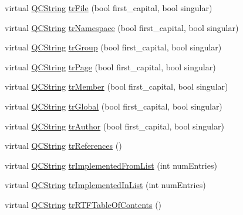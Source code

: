 \begin{DoxyCompactItemize}
\item 
virtual \mbox{\hyperlink{class_q_c_string}{Q\+C\+String}} \mbox{\hyperlink{class_translator_serbian_cyrillic_abe6a18cb43ae01fc5613ac70e79057f2}{tr\+File}} (bool first\+\_\+capital, bool singular)
\item 
virtual \mbox{\hyperlink{class_q_c_string}{Q\+C\+String}} \mbox{\hyperlink{class_translator_serbian_cyrillic_a4cdb3dde664df2215ece9b5e2a16765a}{tr\+Namespace}} (bool first\+\_\+capital, bool singular)
\item 
virtual \mbox{\hyperlink{class_q_c_string}{Q\+C\+String}} \mbox{\hyperlink{class_translator_serbian_cyrillic_ac018e6eee4a3d617597eadb73f7c8405}{tr\+Group}} (bool first\+\_\+capital, bool singular)
\item 
virtual \mbox{\hyperlink{class_q_c_string}{Q\+C\+String}} \mbox{\hyperlink{class_translator_serbian_cyrillic_aa70581c3066afd3ac53605b4bd7a409f}{tr\+Page}} (bool first\+\_\+capital, bool singular)
\item 
virtual \mbox{\hyperlink{class_q_c_string}{Q\+C\+String}} \mbox{\hyperlink{class_translator_serbian_cyrillic_a809c827e24ad426d7122f89355def798}{tr\+Member}} (bool first\+\_\+capital, bool singular)
\item 
virtual \mbox{\hyperlink{class_q_c_string}{Q\+C\+String}} \mbox{\hyperlink{class_translator_serbian_cyrillic_aa68a3ebc8e9d1abf363203338eab2852}{tr\+Global}} (bool first\+\_\+capital, bool singular)
\item 
virtual \mbox{\hyperlink{class_q_c_string}{Q\+C\+String}} \mbox{\hyperlink{class_translator_serbian_cyrillic_a702ebd41ff43cba4154a980781c43eea}{tr\+Author}} (bool first\+\_\+capital, bool singular)
\item 
virtual \mbox{\hyperlink{class_q_c_string}{Q\+C\+String}} \mbox{\hyperlink{class_translator_serbian_cyrillic_af031ca3bda559092a82830b048761fc4}{tr\+References}} ()
\item 
virtual \mbox{\hyperlink{class_q_c_string}{Q\+C\+String}} \mbox{\hyperlink{class_translator_serbian_cyrillic_a993e76a71b8379cf8ea8dfdd3cd33ff8}{tr\+Implemented\+From\+List}} (int num\+Entries)
\item 
virtual \mbox{\hyperlink{class_q_c_string}{Q\+C\+String}} \mbox{\hyperlink{class_translator_serbian_cyrillic_a3caf4e16c2280541c5bc5d512fa6ae58}{tr\+Implemented\+In\+List}} (int num\+Entries)
\item 
virtual \mbox{\hyperlink{class_q_c_string}{Q\+C\+String}} \mbox{\hyperlink{class_translator_serbian_cyrillic_a2f31d5298e5c2698b083c86a49d0b411}{tr\+R\+T\+F\+Table\+Of\+Contents}} ()

\end{DoxyCompactItemize}
